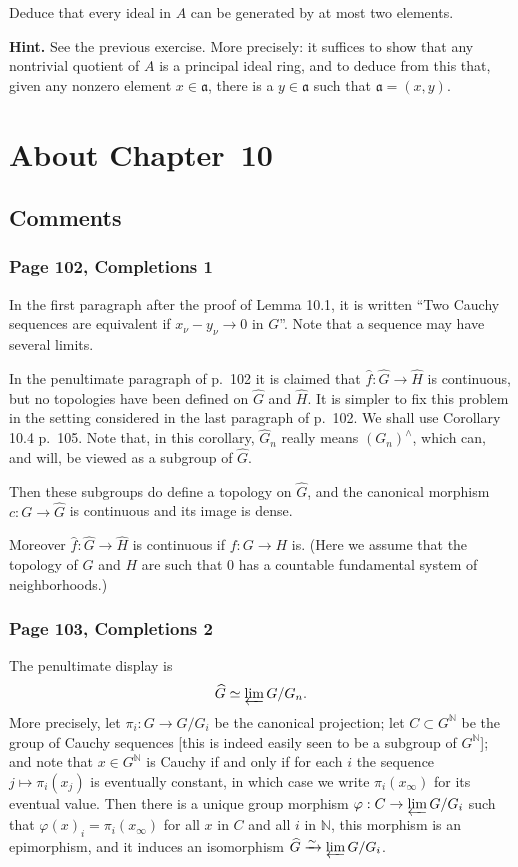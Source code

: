 \documentclass[12pt,letterpaper]{article}%
\newcommand{\mf}{\mathfrak}
\newcommand{\aaa}{\mf a}
\newcommand{\nn}{\noindent}
\begin{document}
Deduce that every ideal in $A$ can be generated by at most two elements. 

\nn\textbf{Hint.} See the previous exercise. More precisely: it suffices to show that any nontrivial quotient of $A$ is a principal ideal ring, and to deduce from this that, given any nonzero element $x\in\aaa$, there is a $y\in\aaa$ such that $\aaa=(x,y)$. 

\newpage

\section{About Chapter~10}%

\subsection{Comments}%

\subsubsection{Page 102, Completions 1}%

In the first paragraph after the proof of Lemma 10.1, it is written ``Two Cauchy sequences are equivalent if $x_\nu-y_\nu\to0$ in $G$''. Note that a sequence may have several limits. 

In the penultimate paragraph of p.~102 it is claimed that $\widehat f:\widehat G\to\widehat H$ is continuous, but no topologies have been defined on $\widehat G$ and $\widehat H$. It is simpler to fix this problem in the setting considered in the last paragraph of p.~102. We shall use Corollary 10.4 p.~105. Note that, in this corollary, $\widehat G_n$ really means $(G_n)^\wedge$, which can, and will, be viewed as a subgroup of $\widehat G$. 

Then these subgroups do define a topology on $\widehat G$, and the canonical morphism $c:G\to\widehat G$ is continuous and its image is dense. 

Moreover $\widehat f:\widehat G\to\widehat H$ is continuous if $f:G\to H$ is. (Here we assume that the topology of $G$ and $H$ are such that $0$ has a countable fundamental system of neighborhoods.)

\subsubsection{Page 103, Completions 2}%

The penultimate display is 
$$
\widehat G\simeq\varprojlim G/G_n.
$$ 
More precisely, let $\pi_i:G\to G/G_i$ be the canonical projection; let $C\subset G^{\mathbb N}$ be the group of Cauchy sequences [this is indeed easily seen to be a subgroup of $G^{\mathbb N}$]; and note that $x\in G^{\mathbb N}$ is Cauchy if and only if for each $i$ the sequence $j\mapsto\pi_i(x_j)$ is eventually constant, in which case we write $\pi_i(x_\infty)$ for its eventual value. Then there is a unique group morphism $\varphi:C\to\varprojlim G/G_i$ such that $\varphi(x)_i=\pi_i(x_\infty)$ for all $x$ in $C$ and all $i$ in $\mathbb N$, this morphism is an epimorphism, and it induces an isomorphism $\widehat G\xrightarrow\sim\varprojlim G/G_i$. 
\end{document}

